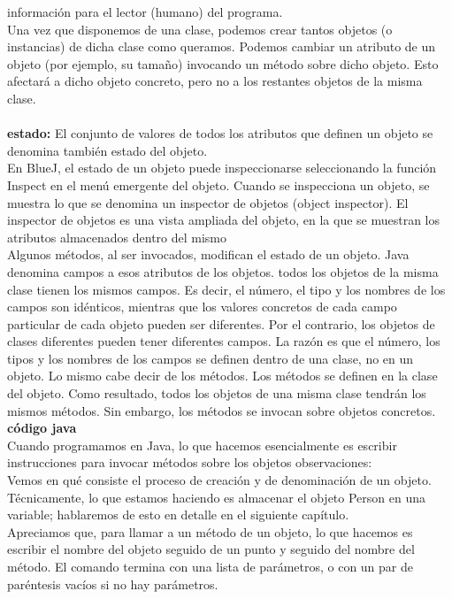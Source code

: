 \documentclass[11pt,a4paper]{article}
\begin{document}
	información para el lector (humano) del programa. \\
	Una vez que disponemos de una clase, podemos crear tantos objetos (o instancias) de dicha
	clase como queramos. Podemos cambiar un atributo
	de un objeto (por ejemplo, su tamaño) invocando un método sobre dicho objeto. Esto afectará a
	dicho objeto concreto, pero no a los restantes objetos de la misma clase.\\
	\\
	\textbf{estado:} El conjunto de valores de todos los atributos que definen un objeto se denomina también estado del
	objeto.\\
	En BlueJ, el estado de un objeto puede inspeccionarse seleccionando la función Inspect en el menú
	emergente del objeto. Cuando se inspecciona un objeto, se muestra lo que se denomina un inspector
	de objetos (object inspector). El inspector de objetos es una vista ampliada del objeto, en la que
	se muestran los atributos almacenados dentro del mismo\\
	Algunos métodos, al ser invocados, modifican el estado de un objeto. Java denomina campos a esos atributos de los objetos. todos los objetos de la misma clase tienen los
	mismos campos. Es decir, el número, el tipo y los nombres de los campos son idénticos, mientras
	que los valores concretos de cada campo particular de cada objeto pueden ser diferentes. Por el
	contrario, los objetos de clases diferentes pueden tener diferentes campos. La razón es que el número, los tipos y los nombres de los campos se definen dentro de una clase,
	no en un objeto. Lo mismo cabe decir de los métodos. Los métodos se definen en la clase del objeto. Como resultado,
	todos los objetos de una misma clase tendrán los mismos métodos. Sin embargo, los métodos
	se invocan sobre objetos concretos.\\
	\textbf{código java}\\
	Cuando programamos en Java, lo que hacemos esencialmente es escribir instrucciones para
	invocar métodos sobre los objetos
	observaciones:\\
	Vemos en qué consiste el proceso de creación y de denominación de un objeto. Técnicamente,
	lo que estamos haciendo es almacenar el objeto Person en una variable; hablaremos de esto en
	detalle en el siguiente capítulo.\\
	Apreciamos que, para llamar a un método de un objeto, lo que hacemos es escribir el nombre
	del objeto seguido de un punto y seguido del nombre del método. El comando termina con una
	lista de parámetros, o con un par de paréntesis vacíos si no hay parámetros.\\
\end{document}
